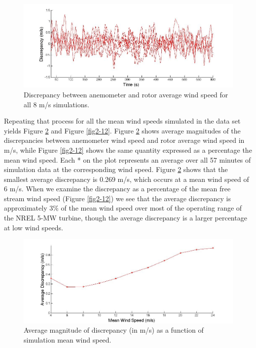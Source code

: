 \begin{figure}[htbp]
	\centering
		\includegraphics[trim = {.25cm 0 2.5cm 0}, clip, width = .95\linewidth]{Figures/ch2Figures/fig2-10.jpg}
		
	\caption{Discrepancy between anemometer and rotor average wind speed for all 8 m/s simulations.}
	\label{fig2-10}
\end{figure}


Repeating that process for all the mean wind speeds simulated in the data set yields Figure \ref{fig2-11} and Figure \ref{fig2-12}. Figure \ref{fig2-11} shows average magnitudes of the discrepancies between anemometer wind speed and rotor average wind speed in m/s, while Figure \ref{fig2-12} shows the same quantity expressed as a percentage the mean wind speed. Each * on the plot represents an average over all 57 minutes of simulation data at the corresponding wind speed. Figure \ref{fig2-11} shows that the smallest average discrepancy is 0.269 m/s, which occurs at a mean wind speed of  6 m/s. When we examine the discrepancy as a percentage of the mean free stream wind speed  (Figure \ref{fig2-12}) we see that the average discrepancy is approximately 3\% of the mean wind speed over most of the operating range of the NREL 5-MW turbine, though the  average discrepancy is a larger percentage at low wind speeds.

\begin{figure}[htbp]
	\centering
		\includegraphics[width = \linewidth]{Figures/ch2Figures/fig2-11.jpg}
		
	\caption{Average magnitude of discrepancy (in m/s) as a function of simulation mean wind speed.}
	\label{fig2-11}
\end{figure}

